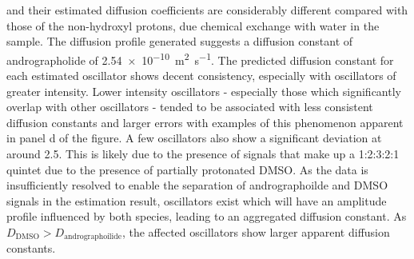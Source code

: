 and their estimated diffusion coefficients are considerably different compared
with those of the non-hydroxyl protons, due chemical exchange with water in the
sample\cite{Chen1998}.
The diffusion profile generated suggests a diffusion constant of andrographolide of
\qty{2.54e-10}{\meter\squared\per\second}. The predicted diffusion constant for
each estimated oscillator shows decent consistency, especially with oscillators
of greater intensity. Lower intensity oscillators - especially those which
significantly overlap with other oscillators - tended to be associated with
less consistent diffusion constants and larger errors with examples of this
phenomenon apparent in panel d of the figure. A few oscillators also show a
significant deviation at around \qty{2.5}{\partspermillion}. This is likely due to
the presence of signals that make up a 1:2:3:2:1 quintet due to the presence of
partially protonated \acs{DMSO}. As the data is
insufficiently resolved to enable the separation of andrographoilde and
\ac{DMSO} signals in the estimation result, oscillators exist which
will have an amplitude profile influenced by both species, leading to an
aggregated diffusion constant. As $D_{\text{DMSO}} >
D_{\text{andrographoilide}}$, the affected oscillators show larger apparent
diffusion constants.


